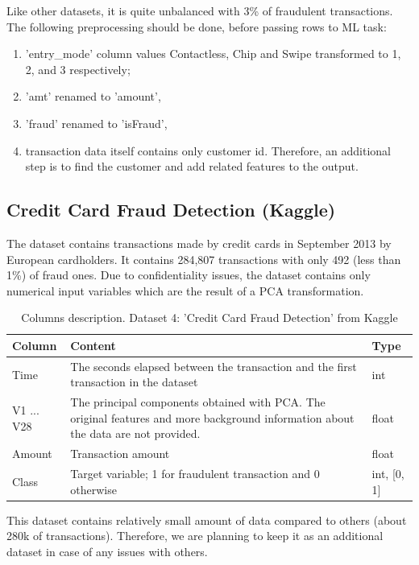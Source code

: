 \documentclass[12pt,a4paper, hidelinks]{article}
\begin{document}
Like other datasets, it is quite unbalanced with 3\% of fraudulent transactions. The following preprocessing should be done, before passing rows to ML task:
\begin{enumerate}
    \item 'entry\_mode' column values Contactless, Chip and Swipe transformed to 1, 2, and 3 respectively;
    \item 'amt' renamed to 'amount',
    \item 'fraud' renamed to 'isFraud',
    \item transaction data itself contains only customer id. Therefore, an additional step is to find the customer and add related features to the output.
\end{enumerate}


\subsection{Credit Card Fraud Detection (Kaggle)}

The dataset contains transactions made by credit cards in September 2013 by European cardholders. It contains 284,807 transactions with only 492 (less than 1\%) of fraud ones. Due to confidentiality issues, the dataset contains only numerical input variables which are the result of a PCA transformation.

\begin{table}[ht!]
    \centering
    \begin{tabular}{|p{2.5cm}|p{10cm}|p{2cm}|}
    \hline
    \textbf{Column} & \textbf{Content} & \textbf{Type} \\
    \hline
    Time & The seconds elapsed between the transaction and the first transaction in the dataset & int \\
    \hline
    V1 ... V28 & The principal components obtained with PCA. The original features and more background information about the data are not provided. & float \\
    \hline
    Amount & Transaction amount & float \\
    \hline
    Class & Target variable; 1 for fraudulent transaction and 0 otherwise & int, [0, 1] \\
    \hline
    \end{tabular}
    \caption{Columns description. Dataset 4: 'Credit Card Fraud Detection' from Kaggle}
\end{table}

This dataset contains relatively small amount of data compared to others (about 280k of transactions). Therefore, we are planning to keep it as an additional dataset in case of any issues with others.
\end{document}
